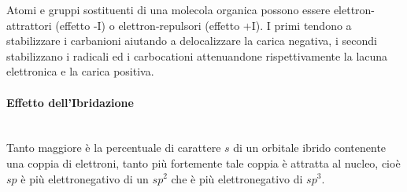 Atomi e gruppi sostituenti di una molecola organica possono essere elettron-attrattori (effetto -I) o elettron-repulsori (effetto +I). I primi tendono a stabilizzare i carbanioni aiutando a delocalizzare la carica negativa, i secondi stabilizzano i radicali ed i carbocationi attenuandone rispettivamente la lacuna elettronica e la carica positiva.

\paragraph{Effetto dell'Ibridazione}\mbox{}\\
Tanto maggiore è la percentuale di carattere \(s\) di un orbitale ibrido contenente una coppia di elettroni, tanto più fortemente tale coppia è attratta al nucleo, cioè \(sp\) è più elettronegativo di un \(sp^2\) che è più elettronegativo di \(sp^3\).